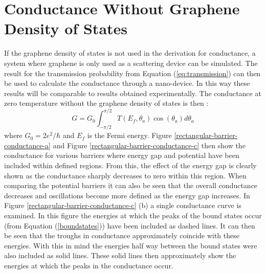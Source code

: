 \documentclass[12pt,a4paper]{report}
\begin{document}
		\section{Conductance Without Graphene Density of States}
		\label{Rectangular Barrier - Conductance Withount Graphene Density of States}
			If the graphene density of states is not used in the derivation for conductance, a system where graphene is only used as a scattering device can be simulated. The result for the transmission probability from Equation (\ref{eq:transmission}) can then be used to calculate the conductance through a nano-device. In this way these results will be comparable to results obtained experimentally. The conductance at zero temperature without the graphene density of states is then \cite{b4, b13, b16}:
			\begin{equation}
				G=G_{0}\int^{\pi/2}_{-\pi/2}T\left(E_{f},\theta_{a}\right)\cos(\theta_{a})d\theta_{a}
				\label{g}
			\end{equation}
			where $G_{0}=2e^{2}/\hbar$ and $E_{f}$ is the Fermi energy. Figure \ref{rectangular-barrier-conductance-a} and Figure \ref{rectangular-barrier-conductance-c} then show the conductance for various barriers where energy gap and potential have been included within defined regions. From this, the effect of the energy gap is clearly shown as the conductance sharply decreases to zero within this region. When comparing the potential barriers it can also be seen that the overall conductance decreases and oscillations become more defined as the energy gap increases. In Figure \ref{rectangular-barrier-conductance-c} (b) a single conductance curve is examined. In this figure the energies at which the peaks of the bound states occur (from Equation (\ref{boundstates})) have been included as dashed lines. It can then be seen that the troughs in conductance approximately coincide with these energies. With this in mind the energies half way between the bound states were also included as solid lines. These solid lines then approximately show the energies at which the peaks in the conductance occur.
\end{document}
